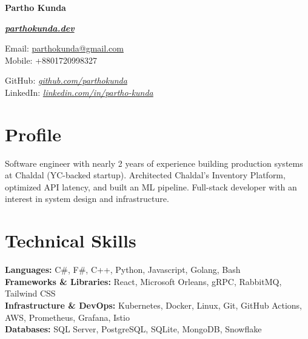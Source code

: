 \documentclass[letterpaper,10pt]{article}
\begin{document}
\noindent
\begin{minipage}[t]{0.35\textwidth}
{\LARGE \textbf{Partho Kunda}}\\
\end{minipage}
\hfill
\begin{minipage}[t]{0.55\textwidth}
\raggedleft
{\large \href{https://parthokunda.dev}{\textit{\textbf{parthokunda.dev}}}}
\end{minipage}
\hfill

\begin{minipage}[t]{0.35\textwidth}
    Email: \href{mailto:parthokunda@gmail.com}{parthokunda@gmail.com}\\
    Mobile: +8801720998327
\end{minipage}
\hfill %
\begin{minipage}[t]{0.55\textwidth} %
    \raggedleft
    GitHub: \href{https://github.com/parthokunda/}{\textit{github.com/parthokunda}}\\ %
    LinkedIn: \href{https://www.linkedin.com/in/partho-kunda-bb53148b/}{\textit{linkedin.com/in/partho-kunda}}\\
\end{minipage}
\hfill

\section{Profile}
Software engineer with nearly 2 years of experience building production systems at Chaldal (YC-backed startup).
Architected Chaldal's Inventory Platform, optimized API latency, and built an ML pipeline.
Full-stack developer with an interest in system design and infrastructure.

\section{Technical Skills}
\textbf{Languages:}{ C\#, F\#, C++, Python, Javascript, Golang, Bash} \\
\textbf{Frameworks \& Libraries:}{ React, Microsoft Orleans, gRPC, RabbitMQ, Tailwind CSS} \\
\textbf{Infrastructure \& DevOps:}{ Kubernetes, Docker, Linux, Git, GitHub Actions, AWS, Prometheus, Grafana, Istio} \\
\textbf{Databases:}{ SQL Server, PostgreSQL, SQLite, MongoDB, Snowflake}
\end{document}
